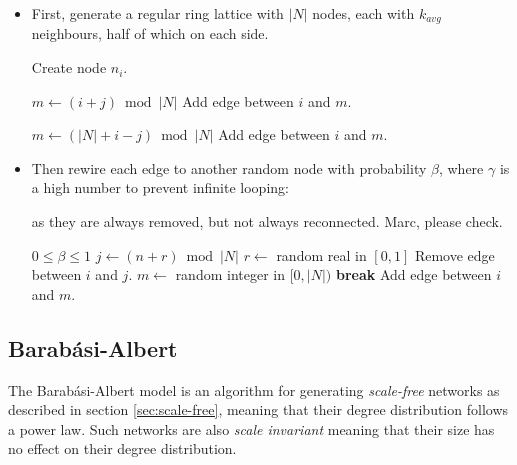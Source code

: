 \documentclass[a4paper,11pt,titlepage]{article}
\begin{document}
\begin{itemize}
  \item First, generate a regular ring lattice with $|N|$ nodes,
        each with $k_{avg}$ neighbours, half of which on each side.

  \begin{algorithmic}
      \STATE Create node $n_i$.
    \ENDFOR

        \STATE $m \gets (i + j) \bmod{|N|}$
        \STATE Add edge between $i$ and $m$.
      \ENDFOR

        \STATE $m \gets (|N| + i - j) \bmod{|N|}$
        \STATE Add edge between $i$ and $m$.
      \ENDFOR
    \ENDFOR
  \end{algorithmic}

  \item Then rewire each edge to another random node with
        probability $\beta$, where $\gamma$ is a high number
        to prevent infinite looping:

         as they are always removed, but not always reconnected.
         Marc, please check.

  \begin{algorithmic}
    \REQUIRE $0 \leq \beta \leq 1$
        \STATE $j \gets (n + r) \bmod{|N|}$
        \STATE $r \gets$ random real in $[0, 1]$
          \STATE Remove edge between $i$ and $j$.
            \STATE $m \gets$ random integer in $[0, |N|)$
              \STATE \textbf{break}
            \ELSE
              \STATE Add edge between $i$ and $m$.
            \ENDIF
          \ENDFOR
        \ENDIF
      \ENDFOR
    \ENDFOR
  \end{algorithmic}
\end{itemize}

\subsection{Barab\'{a}si-Albert}

The Barab\'{a}si-Albert model is an algorithm for generating \emph{scale-free}
networks as described in section \ref{sec:scale-free}, meaning that
their degree distribution follows a power law. Such networks are also
\emph{scale invariant} meaning that their size has no effect on their
degree distribution.
\end{document}
